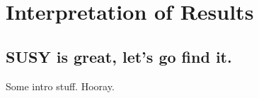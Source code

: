 \chapter{Interpretation of Results}

\ifpdf
    \graphicspath{{Chapter9/Figs/Raster/}{Chapter9/Figs/PDF/}{Chapter9/Figs/}}
\else
    \graphicspath{{Chapter9/Figs/Vector/}{Chapter9/Figs/}}
\fi


\section{SUSY is great, let's go find it.}  %

Some intro stuff. Hooray.